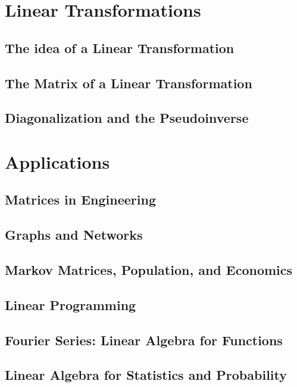 \documentclass{book}
\begin{document}
\chapter{Linear Transformations}
\section{The idea of a Linear Transformation}

\section{The Matrix of a Linear Transformation}

\section{Diagonalization and the Pseudoinverse}









\chapter{Applications}
\section{Matrices in Engineering}

\section{Graphs and Networks}

\section{Markov Matrices, Population, and Economics}

\section{Linear Programming}

\section{Fourier Series: Linear Algebra for Functions}

\section{Linear Algebra for Statistics and Probability}
\end{document}
